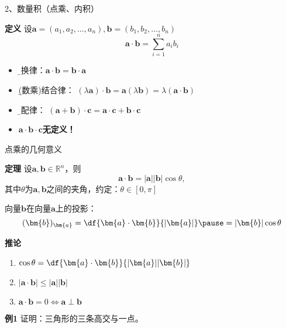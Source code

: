 \begin{frame}{2、数量积（点乘、内积）}
	\linespread{1.2}\pause 
	\begin{block}{{\bf 定义} \hfill}
		设$\bm{a}=(a_1,a_2,\ldots,a_n),\bm{b}=(b_1,b_2,\ldots,b_n)$\pause 
		$$\bm{a}\cdot\bm{b}=\sum\limits_{i=1}^na_ib_i$$
	\end{block}\pause 
	\begin{itemize}
	  \item {\b 交换律：}$\bm{a}\cdot\bm{b}=\bm{b}\cdot\bm{a}$\pause 
	  \item {\b (数乘)结合律：}
	  $(\lambda\bm{a})\cdot\bm{b}=\bm{a}(\lambda\bm{b})=\lambda(\bm{a}\cdot\bm{b})$\pause
	  
	  \item {\b 分配律：}
	  $(\bm{a}+\bm{b})\cdot\bm{c}=\bm{a}\cdot\bm{c}+\bm{b}\cdot\bm{c}$\pause 
	  \item \alert{\bf
	  $\bm{a}\cdot\bm{b}\cdot\bm{c}$无定义！}
	\end{itemize}
\end{frame}

\begin{frame}{点乘的几何意义}
	\linespread{1.2}\pause 
	\begin{block}{{\bf 定理}\hfill}
		设$\bm{a},\bm{b}\in\mathbb{R}^n$，则
		$$\bm{a}\cdot\bm{b}=|\bm{a}||\bm{b}|\cos\theta,$$
		其中$\theta$为$\bm{a},\bm{b}$之间的夹角，约定：$\theta\in[0,\pi]$
	\end{block}
	\pause 
	{\bb 向量$\bm{b}$在向量$\bm{a}$上的投影：}
	$$(\bm{b})_{\bm{a}}=\df{\bm{a}\cdot\bm{b}}{|\bm{a}|}\pause
	=|\bm{b}|\cos\theta$$
\end{frame}

\begin{frame}
	\linespread{1.2}
	\begin{block}{{\bf 推论}\hfill}\pause 
		\begin{enumerate}
		  \item $\cos\theta=\df{\bm{a}\cdot\bm{b}}{|\bm{a}||\bm{b}|}$\pause 
		  \item $|\bm{a}\cdot\bm{b}|\leq|\bm{a}||\bm{b}|$\pause \hfill 
		  \hspace{-2em}{\b (Cauchy-Schwartz不等式)}\pause 
		  \item $\bm{a}\cdot\bm{b}=0\Leftrightarrow\bm{a}\perp\bm{b}$
		\end{enumerate}
	\end{block}\pause 
	\bigskip
	\begin{exampleblock}{{\bf 例1}\hfill}
		证明：三角形的三条高交与一点。
	\end{exampleblock}
\end{frame}

